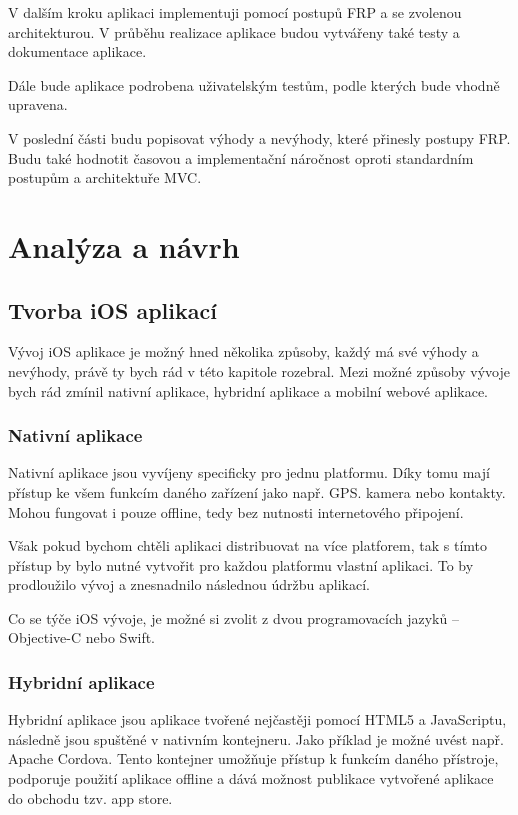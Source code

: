 \documentclass[thesis=M,czech]{FITthesis}[2012/06/26]
\begin{document}
V dalším kroku aplikaci implementuji pomocí postupů FRP a se zvolenou architekturou. V průběhu realizace aplikace budou vytvářeny také testy a dokumentace aplikace.

Dále bude aplikace podrobena uživatelským testům, podle kterých bude vhodně upravena.

V poslední části budu popisovat výhody a nevýhody, které přinesly postupy FRP. Budu také hodnotit časovou a implementační náročnost oproti standardním postupům a architektuře MVC. 


\chapter{Analýza a návrh}

\section{Tvorba iOS aplikací}
Vývoj iOS aplikace je možný hned několika způsoby, každý má své výhody a nevýhody, právě ty bych rád v této kapitole rozebral. Mezi možné způsoby vývoje bych rád zmínil nativní aplikace, hybridní aplikace a mobilní webové aplikace.

\subsection{Nativní aplikace}
Nativní aplikace jsou vyvíjeny specificky pro jednu platformu. Díky tomu mají přístup ke všem funkcím daného zařízení jako např. GPS. kamera nebo kontakty. Mohou fungovat i pouze offline, tedy bez nutnosti internetového připojení. \cite{Nielsen}

Však pokud bychom chtěli aplikaci distribuovat na více platforem, tak s tímto přístup by bylo nutné vytvořit pro každou platformu vlastní aplikaci. To by prodloužilo vývoj a znesnadnilo následnou údržbu aplikací.

Co se týče iOS vývoje, je možné si zvolit z dvou programovacích jazyků -- Objective-C nebo Swift. \cite{objc} \cite{swift}

\subsection{Hybridní aplikace}
Hybridní aplikace jsou aplikace tvořené nejčastěji pomocí HTML5 a JavaScriptu, následně jsou spuštěné v nativním kontejneru. \cite{saleforce} Jako příklad je možné uvést např. Apache Cordova. Tento kontejner umožňuje přístup k funkcím daného přístroje, podporuje použití aplikace offline a dává možnost publikace vytvořené aplikace do obchodu tzv. app store. \cite{cordova}
\end{document}
